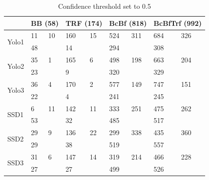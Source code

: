 \begin{table}[h!]
\centering
\begin{tabular}{l|ll|ll|ll|ll}
                       & \multicolumn{2}{l|}{BB (58)} & \multicolumn{2}{l|}{TRF (174)} & \multicolumn{2}{l|}{BcBf (818)} & \multicolumn{2}{l|}{BcBfTrf (992)} \\ \hline
\multirow{2}{*}{Yolo1} & 11            & 10           & 160            & 15            & 524            & 311            & 684              & 326             \\
                       & 48            &              & 14             &               & 294            &                & 308              &                 \\ \hline
\multirow{2}{*}{Yolo2} & 35            & 1            & 165            & 6             & 498            & 198            & 663              & 204             \\
                       & 23            &              & 9              &               & 320            &                & 329              &                 \\ \hline
\multirow{2}{*}{Yolo3} & 36            & 4            & 170            & 2             & 577            & 149            & 747              & 151             \\
                       & 22            &              & 4              &               & 241            &                & 245              &                 \\ \hline
\multirow{2}{*}{SSD1}  & 6             & 11           & 142            & 11            & 333            & 251            & 475              & 262             \\
                       & 53            &              & 32             &               & 485            &                & 517              &                 \\ \hline
\multirow{2}{*}{SSD2}  & 29            & 9            & 136            & 22            & 299            & 338            & 435              & 360             \\
                       & 29            &              & 38             &               & 519            &                & 557              &                 \\ \hline
\multirow{2}{*}{SSD3}  & 31            & 6            & 147            & 14            & 319            & 214            & 466              & 228             \\
                       & 27            &              & 27             &               & 499            &                & 526              &                
\end{tabular}
\caption{Confidence threshold set to 0.5}
\end{table}

